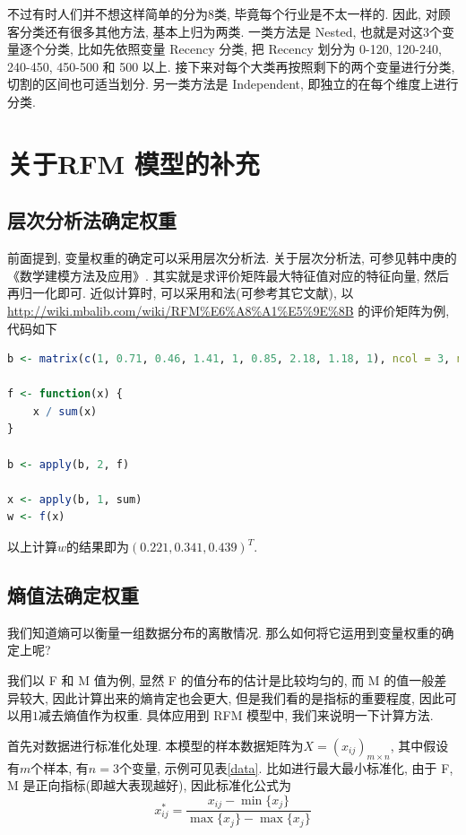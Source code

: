 \documentclass[a4paper,UTF8]{ctexart}
\theoremstyle{plain} \newtheorem{theorem}{定理}[section]
\theoremstyle{plain} \newtheorem{definition}{定义}[section]
\theoremstyle{plain} \newtheorem{lemma}{引理}[section]
\theoremstyle{plain} \newtheorem{proposition}{命题}[section]
\theoremstyle{plain} \newtheorem{example}{例}[section]
\theoremstyle{plain} \newtheorem{remark}{注}[section]
\theoremstyle{plain} \newtheorem{corollary}{推论}[section]
\begin{document}
不过有时人们并不想这样简单的分为$8$类, 毕竟每个行业是不太一样的. 因此, 对顾客分类还有很多其他方法, 基本上归为两类. 一类方法是 Nested, 也就是对这$3$个变量逐个分类, 比如先依照变量 Recency 分类, 把 Recency 划分为 0-120, 120-240, 240-450, 450-500 和 500 以上. 接下来对每个大类再按照剩下的两个变量进行分类, 切割的区间也可适当划分. 另一类方法是 Independent, 即独立的在每个维度上进行分类.






\section{关于RFM 模型的补充}
\subsection{层次分析法确定权重}
前面提到, 变量权重的确定可以采用层次分析法. 关于层次分析法, 可参见韩中庚的《数学建模方法及应用》. 其实就是求评价矩阵最大特征值对应的特征向量, 然后再归一化即可. 近似计算时, 可以采用和法(可参考其它文献), 以 \url{http://wiki.mbalib.com/wiki/RFM%E6%A8%A1%E5%9E%8B} 的评价矩阵为例, 代码如下
\begin{lstlisting}[language=r]
b <- matrix(c(1, 0.71, 0.46, 1.41, 1, 0.85, 2.18, 1.18, 1), ncol = 3, nrow = 3, byrow = T)

f <- function(x) {
    x / sum(x)
}

b <- apply(b, 2, f)

x <- apply(b, 1, sum)
w <- f(x)
\end{lstlisting}

以上计算$w$的结果即为$(0.221, 0.341, 0.439)^{T}$.


\subsection{熵值法确定权重}
我们知道熵可以衡量一组数据分布的离散情况. 那么如何将它运用到变量权重的确定上呢?

我们以 F 和 M 值为例, 显然 F 的值分布的估计是比较均匀的, 而 M 的值一般差异较大, 因此计算出来的熵肯定也会更大, 但是我们看的是指标的重要程度, 因此可以用$1$减去熵值作为权重. 具体应用到 RFM 模型中, 我们来说明一下计算方法.

首先对数据进行标准化处理. 本模型的样本数据矩阵为$X = (x_{ij})_{m \times n}$, 其中假设有$m$个样本, 有$n = 3$个变量, 示例可见表\ref{data}.
比如进行最大最小标准化, 由于 F, M 是正向指标(即越大表现越好), 因此标准化公式为
\begin{equation*}
x_{ij}^{*} = \frac{x_{ij} - \min \{x_j\}}{\max \{x_j\} - \max \{x_j\}}
\end{equation*}
\end{document}

